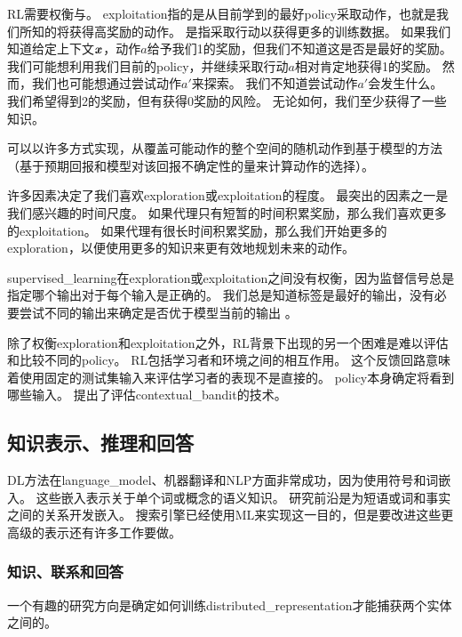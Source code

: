 
\gls{RL}需要权衡与。
\gls{exploitation}指的是从目前学到的最好\gls{policy}采取动作，也就是我们所知的将获得高奖励的动作。
是指采取行动以获得更多的训练数据。
如果我们知道给定上下文$\boldsymbol{\mathit{x}}$，动作$a$给予我们1的奖励，但我们不知道这是否是最好的奖励。
我们可能想利用我们目前的\gls{policy}，并继续采取行动$a$相对肯定地获得1的奖励。
然而，我们也可能想通过尝试动作$a'$来探索。
我们不知道尝试动作$a'$会发生什么。
我们希望得到2的奖励，但有获得0奖励的风险。
无论如何，我们至少获得了一些知识。

可以以许多方式实现，从覆盖可能动作的整个空间的随机动作到基于模型的方法（基于预期回报和模型对该回报不确定性的量来计算动作的选择）。

许多因素决定了我们喜欢\gls{exploration}或\gls{exploitation}的程度。
最突出的因素之一是我们感兴趣的时间尺度。
如果代理只有短暂的时间积累奖励，那么我们喜欢更多的\gls{exploitation}。
如果代理有很长时间积累奖励，那么我们开始更多的\gls{exploration}，以便使用更多的知识来更有效地规划未来的动作。

\gls{supervised_learning}在\gls{exploration}或\gls{exploitation}之间没有权衡，因为监督信号总是指定哪个输出对于每个输入是正确的。
我们总是知道标签是最好的输出，没有必要尝试不同的输出来确定是否优于模型当前的输出 。

除了权衡\gls{exploration}和\gls{exploitation}之外，\gls{RL}背景下出现的另一个困难是难以评估和比较不同的\gls{policy}。
\gls{RL}包括学习者和环境之间的相互作用。
这个反馈回路意味着使用固定的测试集输入来评估学习者的表现不是直接的。
\gls{policy}本身确定将看到哪些输入。
\citet{Dudik-2011} 提出了评估\gls{contextual_bandit}的技术。


\subsection{知识表示、推理和回答}
\label{sec:knowledge_representation_reasoning and_question_answering}
\gls{DL}方法在\gls{language_model}、机器翻译和\gls{NLP}方面非常成功，因为使用符号\citep{Rumelhart86b-small}和词嵌入\citep{Deerwester90,BenDucVin01-small}。 
这些嵌入表示关于单个词或概念的语义知识。
研究前沿是为短语或词和事实之间的关系开发嵌入。
搜索引擎已经使用\gls{ML}来实现这一目的，但是要改进这些更高级的表示还有许多工作要做。

\subsubsection{知识、联系和回答}
一个有趣的研究方向是确定如何训练\gls{distributed_representation}才能捕获两个实体之间的。

